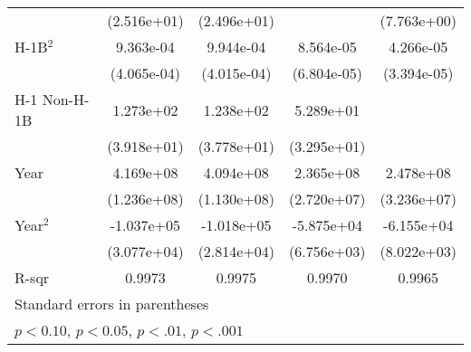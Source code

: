 \begin{tabular}{l*{4}{c}}
                             & (2.516e+01)        & (2.496e+01)        &                    & (7.763e+00)        \\
    \addlinespace
    H-1B$^2$                   &   9.363e-04\sym{++}&   9.944e-04\sym{++}&   8.564e-05        &   4.266e-05        \\
                             & (4.065e-04)        & (4.015e-04)        & (6.804e-05)        & (3.394e-05)        \\
    \addlinespace
    H-1 Non-H-1B             &   1.273e+02\sym{*} &   1.238e+02\sym{*} &   5.289e+01        &                    \\
                             & (3.918e+01)        & (3.778e+01)        & (3.295e+01)        &                    \\
    \addlinespace
    Year                     &   4.169e+08\sym{*} &   4.094e+08\sym{*} &   2.365e+08\sym{**}&   2.478e+08\sym{**}\\
                             & (1.236e+08)        & (1.130e+08)        & (2.720e+07)        & (3.236e+07)        \\
    \addlinespace
    Year$^2$                   &  -1.037e+05\sym{*} &  -1.018e+05\sym{*} &  -5.875e+04\sym{**}&  -6.155e+04\sym{**}\\
                             & (3.077e+04)        & (2.814e+04)        & (6.756e+03)        & (8.022e+03)        \\
    \midrule
    R-sqr                    &      0.9973        &      0.9975        &      0.9970        &      0.9965        \\
    \bottomrule
    \multicolumn{5}{l}{\footnotesize Standard errors in parentheses}\\
    \multicolumn{5}{l}{\footnotesize \sym{+} \(p<0.10\), \sym{++} \(p<0.05\), \sym{*} \(p<.01\), \sym{**} \(p<.001\)}\\
    \end{tabular}